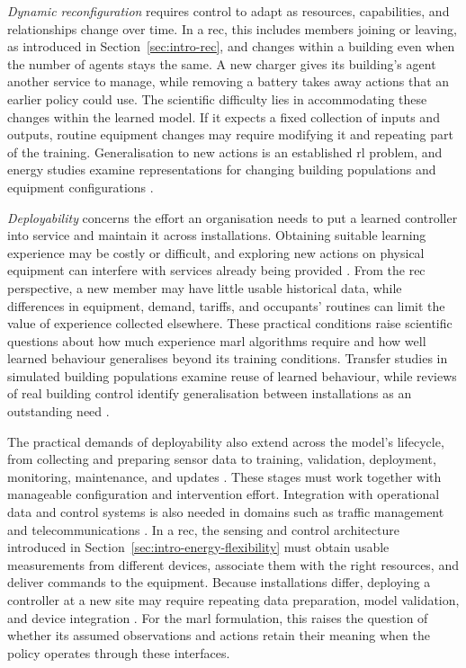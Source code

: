 \emph{Dynamic reconfiguration} requires control to adapt as resources, capabilities, and relationships change over time. In a \gls{rec}, this includes members joining or leaving, as introduced in Section~\ref{sec:intro-rec}, and changes within a building even when the number of agents stays the same. A new charger gives its building's agent another service to manage, while removing a battery takes away actions that an earlier policy could use. The scientific difficulty lies in accommodating these changes within the learned model. If it expects a fixed collection of inputs and outputs, routine equipment changes may require modifying it and repeating part of the training. Generalisation to new actions is an established \gls{rl} problem, and energy studies examine representations for changing building populations and equipment configurations \parencite{jain2020newactions,wu2024dynamicvpp,orfanoudakis2026gnndt}.

\emph{Deployability} concerns the effort an organisation needs to put a learned controller into service and maintain it across installations. Obtaining suitable learning experience may be costly or difficult, and exploring new actions on physical equipment can interfere with services already being provided \parencite{dulacarnold2021realworld}. From the \gls{rec} perspective, a new member may have little usable historical data, while differences in equipment, demand, tariffs, and occupants' routines can limit the value of experience collected elsewhere. These practical conditions raise scientific questions about how much experience \gls{marl} algorithms require and how well learned behaviour generalises beyond its training conditions. Transfer studies in simulated building populations examine reuse of learned behaviour, while reviews of real building control identify generalisation between installations as an outstanding need \parencite{nweye2023merlin,kannari2025realbuildings}.

The practical demands of deployability also extend across the model's lifecycle, from collecting and preparing sensor data to training, validation, deployment, monitoring, maintenance, and updates \parencite{kreuzberger2023mlops,li2022rlops}. These stages must work together with manageable configuration and intervention effort. Integration with operational data and control systems is also needed in domains such as traffic management and telecommunications \parencite{zhang2025realworldvsl,li2022rlops}. In a \gls{rec}, the sensing and control architecture introduced in Section~\ref{sec:intro-energy-flexibility} must obtain usable measurements from different devices, associate them with the right resources, and deliver commands to the equipment. Because installations differ, deploying a controller at a new site may require repeating data preparation, model validation, and device integration \parencite{kannari2025realbuildings,fonseca2025realworldrec}. For the \gls{marl} formulation, this raises the question of whether its assumed observations and actions retain their meaning when the policy operates through these interfaces.

